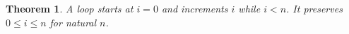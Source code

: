 \documentclass{article}
\newtheorem{theorem}{Theorem}
\begin{document}
\begin{theorem}\label{thm:G08}
A loop starts at $i=0$ and increments $i$ while $i<n$. It preserves $0\le i\le n$ for natural $n$.
\end{theorem}
\end{document}
